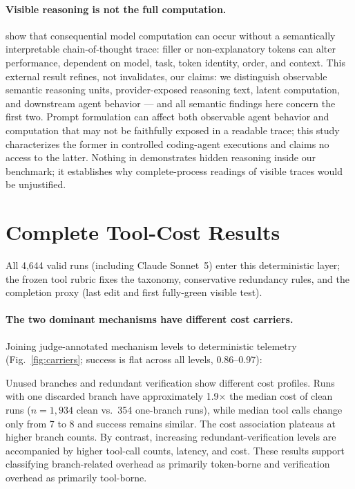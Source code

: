 \documentclass[11pt]{article}
\newcommand{\citet}[1]{\cite{#1}}
\newcommand{\xd}{$\times$}
\begin{document}
\paragraph{Visible reasoning is not the full computation.}
\citet{baherwani2026} show that consequential model computation can occur
without a semantically interpretable chain-of-thought trace: filler or
non-explanatory tokens can alter performance, dependent on model, task,
token identity, order, and context. This external result refines, not
invalidates, our claims: we distinguish observable semantic reasoning
units, provider-exposed reasoning text, latent computation, and downstream
agent behavior --- and all semantic findings here concern the first two.
Prompt formulation can affect both observable agent behavior and
computation that may not be faithfully exposed in a readable trace; this
study characterizes the former in controlled coding-agent executions and
claims no access to the latter. Nothing in \citet{baherwani2026}
demonstrates hidden reasoning inside our benchmark; it establishes why
complete-process readings of visible traces would be unjustified.

\section{Complete Tool-Cost Results}

All 4{,}644 valid runs (including Claude Sonnet~5) enter this deterministic
layer; the frozen tool rubric fixes the taxonomy, conservative redundancy
rules, and the completion proxy (last edit and first fully-green visible
test).

\paragraph{The two dominant mechanisms have different cost carriers.}
Joining judge-annotated mechanism levels to deterministic telemetry
(Fig.~\ref{fig:carriers}; success is flat across all levels, 0.86--0.97):



Unused branches and redundant verification show different cost profiles.
Runs with one discarded branch have approximately 1.9\xd{} the median cost
of clean runs ($n=1{,}934$ clean vs.\ 354 one-branch runs), while median
tool calls change only from 7 to 8 and success remains similar. The cost
association plateaus at higher branch counts. By contrast, increasing
redundant-verification levels are accompanied by higher tool-call counts,
latency, and cost. These results support classifying branch-related overhead
as primarily token-borne and verification overhead as primarily tool-borne.
\end{document}
